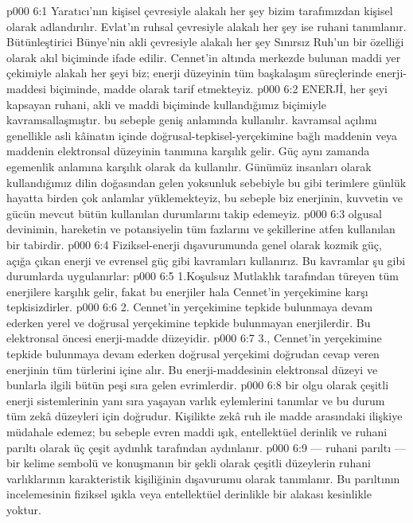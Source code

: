\vs p000 6:1 Yaratıcı’nın kişisel çevresiyle alakalı her şey bizim tarafımızdan kişisel olarak adlandırılır. Evlat’ın ruhsal çevresiyle alakalı her şey ise ruhani tanımlanır. Bütünleştirici Bünye’nin akli çevresiyle alakalı her şey Sınırsız Ruh’un bir özelliği olarak akıl biçiminde ifade edilir. Cennet’in altında merkezde bulunan maddi yer çekimiyle alakalı her şeyi biz; enerji düzeyinin tüm başkalaşım süreçlerinde enerji\hyp{}maddesi biçiminde, madde olarak tarif etmekteyiz.
\vs p000 6:2 ENERJİ, her şeyi kapsayan ruhani, akli ve maddi biçiminde kullandığımız biçimiyle kavramsallaşmıştır.  bu sebeple geniş anlamında kullanılır.  kavramsal açılımı genellikle asli kâinatın içinde doğrusal\hyp{}tepkisel\hyp{}yerçekimine bağlı maddenin veya maddenin elektronsal düzeyinin tanımına karşılık gelir. Güç aynı zamanda egemenlik anlamına karşılık olarak da kullanılır. Günümüz insanları olarak kullandığımız dilin doğasından gelen yoksunluk sebebiyle bu gibi terimlere günlük hayatta birden çok anlamlar yüklemekteyiz, bu sebeple biz enerjinin, kuvvetin ve gücün mevcut bütün kullanılan durumlarını takip edemeyiz.
\vs p000 6:3  olgusal devinimin, hareketin ve potansiyelin tüm fazlarını ve şekillerine atfen kullanılan bir tabirdir.
\vs p000 6:4 Fiziksel\hyp{}enerji dışavurumunda genel olarak kozmik güç, açığa çıkan enerji ve evrensel güç gibi kavramları kullanırız. Bu kavramlar şu gibi durumlarda uygulanırlar:
\vs p000 6:5 1.\bibnobreakspace {}Koşulsuz Mutlaklık tarafından türeyen tüm enerjilere karşılık gelir, fakat bu enerjiler hala Cennet’in yerçekimine karşı tepkisizdirler.
\vs p000 6:6 2.\bibnobreakspace {} Cennet’in yerçekimine tepkide bulunmaya devam ederken yerel ve doğrusal yerçekimine tepkide bulunmayan enerjilerdir. Bu elektronsal öncesi enerji\hyp{}madde düzeyidir.
\vs p000 6:7 3.\bibnobreakspace {}, Cennet’in yerçekimine tepkide bulunmaya devam ederken doğrusal yerçekimi doğrudan cevap veren enerjinin tüm türlerini içine alır. Bu enerji\hyp{}maddesinin elektronsal düzeyi ve bunlarla ilgili bütün peşi sıra gelen evrimlerdir.
\vs p000 6:8 bir olgu olarak çeşitli enerji sistemlerinin yanı sıra yaşayan varlık eylemlerini tanımlar ve bu durum tüm zekâ düzeyleri için doğrudur. Kişilikte zekâ ruh ile madde arasındaki ilişkiye müdahale edemez; bu sebeple evren maddi ışık, entellektüel derinlik ve ruhani parıltı olarak üç çeşit aydınlık tarafından aydınlanır.
\vs p000 6:9 --- ruhani parıltı --- bir kelime sembolü ve konuşmanın bir şekli olarak çeşitli düzeylerin ruhani varlıklarının karakteristik kişiliğinin dışavurumu olarak tanımlanır. Bu parıltının incelemesinin fiziksel ışıkla veya entellektüel derinlikle bir alakası kesinlikle yoktur.
